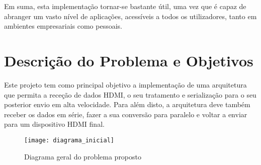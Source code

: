 Em suma, esta implementação tornar-se bastante útil, uma vez que é capaz de abranger um vasto nível de aplicações, acessíveis a todos os utilizadores, tanto em ambientes empresariais como pessoais.

%

\section{Descrição do Problema e Objetivos} \label{sec:descrição_objetivos}

Este projeto tem como principal objetivo a implementação de uma arquitetura que permita a receção de dados HDMI, o seu tratamento e serialização para o seu posterior envio em alta velocidade. Para além disto, a arquitetura deve também receber os dados em série, fazer a sua conversão para paralelo e voltar a enviar para um dispositivo HDMI final.

\begin{figure}[h!]
	\begin{center}
		\leavevmode
		\texttt{[image: diagrama\_inicial]}
		\caption{Diagrama geral do problema proposto}
		\label{fig:diagrama_inicial}
	\end{center}
\end{figure}

